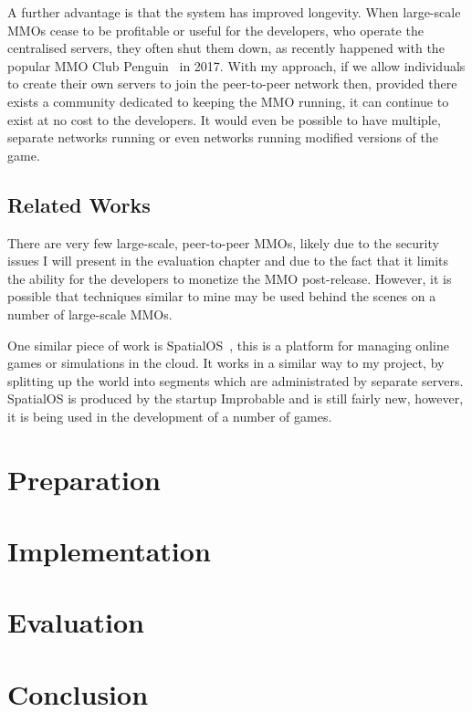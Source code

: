 \documentclass[10pt,twoside,notitlepage,a4paper]{report}
\begin{document}
	A further advantage is that the system has improved longevity. When large-scale MMOs cease to be profitable or useful for the developers, who operate the centralised servers, they often shut them down, as recently happened with the popular MMO Club Penguin~\cite{clubpenguin} in 2017. With my approach, if we allow individuals to create their own servers to join the peer-to-peer network then, provided there exists a community dedicated to keeping the MMO running, it can continue to exist at no cost to the developers. It would even be possible to have multiple, separate networks running or even networks running modified versions of the game.
	
	\section{Related Works}
	There are very few large-scale, peer-to-peer MMOs, likely due to the security issues I will present in the evaluation chapter and due to the fact that it limits the ability for the developers to monetize the MMO post-release. However, it is possible that techniques similar to mine may be used behind the scenes on a number of large-scale MMOs.
	
	One similar piece of work is SpatialOS~\cite{SpatialOS}, this is a platform for managing online games or simulations in the cloud. It works in a similar way to my project, by splitting up the world into segments which are administrated by separate servers. SpatialOS is produced by the startup Improbable and is still fairly new, however, it is being used in the development of a number of games.
	
	\cleardoublepage
	\chapter{Preparation}
	
	\cleardoublepage
	\chapter{Implementation}
	
	\cleardoublepage
	\chapter{Evaluation}
	
	\cleardoublepage
	\chapter{Conclusion}
\end{document}
